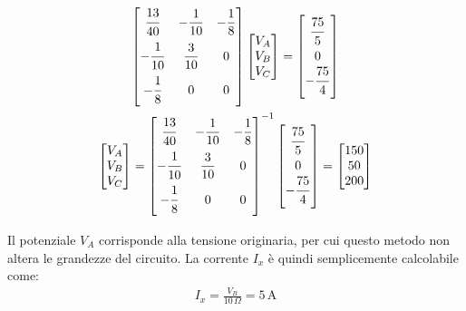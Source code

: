 \documentclass{article}
\numberwithin{equation}{subsection}
\begin{document}
\begin{gather*}
    \begin{bmatrix}
        \displaystyle\frac{\strut 13}{\strut 40}&-\displaystyle\frac{1}{10}&-\displaystyle\frac{1}{8}\\
        -\displaystyle\frac{\strut 1}{\strut 10}&\displaystyle\frac{3}{10}&0\\
        -\displaystyle\frac{\strut 1}{\strut 8}&0&0
    \end{bmatrix}\begin{bmatrix}
        V_A\\V_B\\V_C
    \end{bmatrix}=\begin{bmatrix}
        \displaystyle\frac{\strut 75}{\strut 5}\\0\\-\displaystyle\frac{\strut 75}{\strut 4}
    \end{bmatrix}\\
    \begin{bmatrix}
        V_A\\V_B\\V_C
    \end{bmatrix}=\begin{bmatrix}
        \displaystyle\frac{\strut 13}{\strut 40}&-\displaystyle\frac{1}{10}&-\displaystyle\frac{1}{8}\\
        -\displaystyle\frac{\strut 1}{\strut 10}&\displaystyle\frac{3}{10}&0\\
        -\displaystyle\frac{\strut 1}{\strut 8}&0&0
    \end{bmatrix}^{-1}\begin{bmatrix}
        \displaystyle\frac{\strut 75}{\strut 5}\\0\\-\displaystyle\frac{\strut 75}{\strut 4}
    \end{bmatrix}=\begin{bmatrix}
        150\\50\\200
    \end{bmatrix}
\end{gather*}

Il potenziale $V_A$ corrisponde alla tensione originaria, per cui questo metodo non altera le grandezze del circuito. La corrente $I_x$ è quindi semplicemente calcolabile come:
\begin{gather*}
    I_x=\displaystyle\frac{V_B}{10\,\Omega}=5\,\mathrm{A}
\end{gather*}
\end{document}
